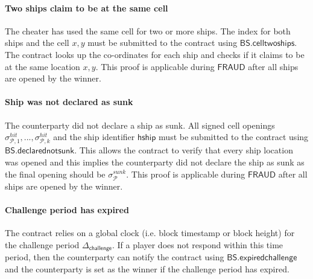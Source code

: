 \documentclass{llncs}
\newcommand{\gamefraud}{\mathsf{FRAUD}}
\newcommand{\hship}{\mathsf{hship}}
\newcommand{\participant}{\mathcal{P}}
\newcommand{\battleshipdeclarednotsunk}{\mathsf{BS.declarednotsunk}}
\newcommand{\battleshiptwoships}{\mathsf{BS.celltwoships}}
\newcommand{\battleshipchallengeexpired}{\mathsf{BS.expiredchallenge}}
\newcommand{\timerchallenge}{\mathsf{\Delta}_{\mathsf{challenge}}}
\begin{document}
	
	
	\paragraph{Two ships claim to be at  the same cell} 
	The cheater has used the same cell for two or more ships.  
	The index for both ships and the cell $x,y$ must be submitted to the contract using $\battleshiptwoships$. 
	The contract looks up the co-ordinates for each ship and checks if it claims to be at the same location $x, y$.
	This proof is applicable during $\gamefraud$ after all ships are opened by the winner. 
	
	\paragraph{Ship was not declared as sunk}
	The counterparty did not declare a ship as sunk. 
	All signed cell openings $\sigma^{hit}_{\participant,1},...,\sigma^{hit}_{\participant,k}$ and the ship identifier $\hship$ must be submitted to the contract using $\battleshipdeclarednotsunk$. 
	This allows the contract to verify that every ship location was opened and this implies the counterparty did not declare the ship as sunk as the final opening should be $\sigma^{sunk}_{\participant}$. 
	This proof is applicable during $\gamefraud$ after all ships are opened by the winner. 
	
	\paragraph{Challenge period has expired }
	The contract relies on a global clock (i.e. block timestamp or block height) for the challenge period  $\timerchallenge$. 
	If a player does not respond within this time period, then the counterparty can notify the contract using $\battleshipchallengeexpired$ and the counterparty is set as the winner if the challenge period has expired. 
	
\end{document}
